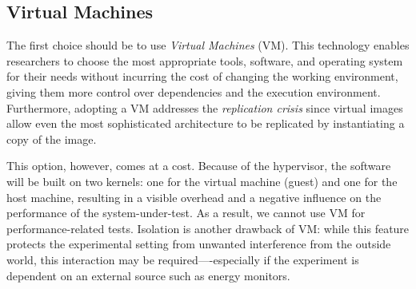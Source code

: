 




\subsection{Virtual Machines}
The first choice should be to use \emph{Virtual Machines} (VM). This technology enables researchers to choose the most appropriate tools, software, and operating system for their needs without incurring the cost of changing the working environment, giving them more control over dependencies and the execution environment.
Furthermore, adopting a VM addresses the \emph{replication crisis} since virtual images allow even the most sophisticated architecture to be replicated by instantiating a copy of the image.

This option, however, comes at a cost. Because of the hypervisor, the software will be built on two kernels: one for the virtual machine (guest) and one for the host machine, resulting in a visible overhead and a negative influence on the performance of the system-under-test.
As a result, we cannot use VM for performance-related tests.
Isolation is another drawback of VM: while this feature protects the experimental setting from unwanted interference from the outside world, this interaction may be required—-especially if the experiment is dependent on an external source such as energy monitors.

